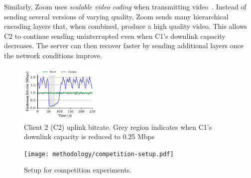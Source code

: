 Similarly, Zoom uses \textit{scalable video coding} when transmitting
video~\cite{zoom_encoding}. Instead of sending several versions of varying
quality, Zoom sends many hierarchical encoding layers that, when combined,
produce a high quality video. This allows C2 to continue sending uninterrupted
even when C1's downlink capacity decreases. The server can then recover faster
by sending additional layers once the network conditions improve.  

\begin{figure}[t]
    \centering
    \includegraphics[width=0.35\textwidth,keepaspectratio]{../figures/interrupt/Interrupt-sender.pdf}
    \caption{Client 2 (C2) uplink bitrate. Grey region indicates when C1's downlink capacity is reduced to 0.25 Mbps}
    \label{fig:interrupt-sender}
\end{figure}

\begin{figure}[]
   \centering
    \texttt{[image: methodology/competition-setup.pdf]}
    \caption{Setup for competition experiments.}
    \label{fig:competition-setup}
\end{figure}


